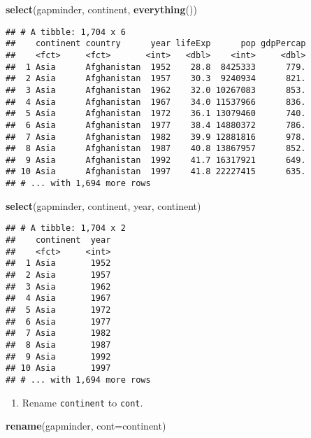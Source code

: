 \documentclass[]{article}
\newenvironment{Shaded}{\begin{snugshade}}{\end{snugshade}}
\newcommand{\KeywordTok}[1]{\textcolor[rgb]{0.13,0.29,0.53}{\textbf{{#1}}}}
\newcommand{\DataTypeTok}[1]{\textcolor[rgb]{0.13,0.29,0.53}{{#1}}}
\newcommand{\NormalTok}[1]{{#1}}
\providecommand{\tightlist}{%
  \setlength{\itemsep}{0pt}\setlength{\parskip}{0pt}}
\begin{document}
\begin{Shaded}
\begin{Highlighting}[]
\KeywordTok{select}\NormalTok{(gapminder, continent, }\KeywordTok{everything}\NormalTok{())}
\end{Highlighting}
\end{Shaded}

\begin{verbatim}
## # A tibble: 1,704 x 6
##    continent country      year lifeExp      pop gdpPercap
##    <fct>     <fct>       <int>   <dbl>    <int>     <dbl>
##  1 Asia      Afghanistan  1952    28.8  8425333      779.
##  2 Asia      Afghanistan  1957    30.3  9240934      821.
##  3 Asia      Afghanistan  1962    32.0 10267083      853.
##  4 Asia      Afghanistan  1967    34.0 11537966      836.
##  5 Asia      Afghanistan  1972    36.1 13079460      740.
##  6 Asia      Afghanistan  1977    38.4 14880372      786.
##  7 Asia      Afghanistan  1982    39.9 12881816      978.
##  8 Asia      Afghanistan  1987    40.8 13867957      852.
##  9 Asia      Afghanistan  1992    41.7 16317921      649.
## 10 Asia      Afghanistan  1997    41.8 22227415      635.
## # ... with 1,694 more rows
\end{verbatim}

\begin{Shaded}
\begin{Highlighting}[]
\KeywordTok{select}\NormalTok{(gapminder, continent, year, continent)}
\end{Highlighting}
\end{Shaded}

\begin{verbatim}
## # A tibble: 1,704 x 2
##    continent  year
##    <fct>     <int>
##  1 Asia       1952
##  2 Asia       1957
##  3 Asia       1962
##  4 Asia       1967
##  5 Asia       1972
##  6 Asia       1977
##  7 Asia       1982
##  8 Asia       1987
##  9 Asia       1992
## 10 Asia       1997
## # ... with 1,694 more rows
\end{verbatim}

\begin{enumerate}
\def\labelenumi{\arabic{enumi}.}
\setcounter{enumi}{4}
\tightlist
\item
  Rename \texttt{continent} to \texttt{cont}.
\end{enumerate}

\begin{Shaded}
\begin{Highlighting}[]
\KeywordTok{rename}\NormalTok{(gapminder, }\DataTypeTok{cont=}\NormalTok{continent)}
\end{Highlighting}
\end{Shaded}
\end{document}
